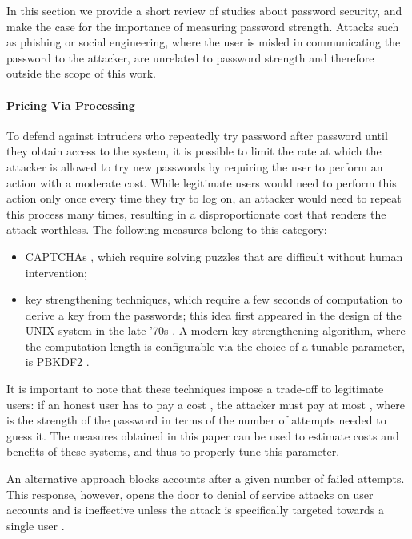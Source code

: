 \documentclass[a4paper,twocolumn]{article}
\begin{document}
\label{sec:Related-Work}In this section we provide a short review
of studies about password security, and make the case for the importance
of measuring password strength. Attacks such as phishing or social
engineering, where the user is misled in communicating the password
to the attacker, are unrelated to password strength and therefore
outside the scope of this work.


\paragraph{Pricing Via Processing}

To defend against intruders who repeatedly try password after password
until they obtain access to the system, it is possible to limit the
rate at which the attacker is allowed to try new passwords by requiring
the user to perform an action with a moderate cost. While legitimate
users would need to perform this action only once every time they
try to log on, an attacker would need to repeat this process many
times, resulting in a disproportionate cost that renders the attack
worthless. The following measures belong to this category:
\begin{itemize}
\item CAPTCHAs \cite{VonAhn2004Telling}, which require solving puzzles
that are difficult without human intervention;
\item key strengthening techniques, which require a few seconds of computation
to derive a key from the passwords; this idea first appeared in the
design of the UNIX system in the late '70s \cite{Morris1979Password}.
A modern key strengthening algorithm, where the computation length
is configurable via the choice of a tunable parameter, is PBKDF2 \cite{Kaliski2000RFC}.
\end{itemize}
It is important to note that these techniques impose a trade-off to
legitimate users: if an honest user has to pay a cost , the attacker
must pay at most , where  is the strength of the password
in terms of the number of attempts needed to guess it. The measures
obtained in this paper can be used to estimate costs and benefits
of these systems, and thus to properly tune this  parameter.

An alternative approach blocks accounts after a given number of failed
attempts. This response, however, opens the door to denial of service
attacks on user accounts and is ineffective unless the attack is specifically
targeted towards a single user \cite{Pinkas2002Securing}.
\end{document}
